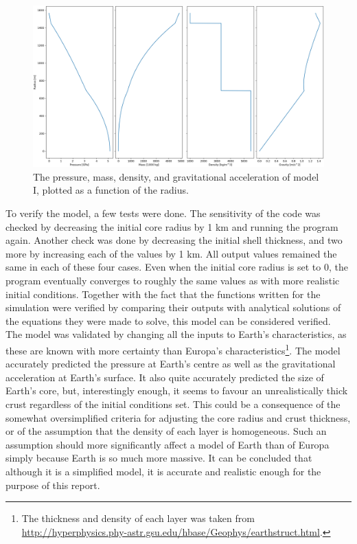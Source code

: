 \documentclass[twocolumn]{article}
\begin{document}
\begin{figure}[h]
	\centering
	\includegraphics[width=\textwidth]{profile1.png}
	\caption{The pressure, mass, density, and gravitational acceleration of model I, plotted as a function of the radius.}
	\label{fig:profile1}
\end{figure}
To verify the model, a few tests were done. The sensitivity of the code was checked by decreasing the initial core radius by 1 km and running the program again. Another check was done by decreasing the initial shell thickness, and two more by increasing each of the values by 1 km. All output values remained the same in each of these four cases. Even when the initial core radius is set to 0, the program eventually converges to roughly the same values as with more realistic initial conditions. Together with the fact that the functions written for the simulation were verified by comparing their outputs with analytical solutions of the equations they were made to solve, this model can be considered verified.\\
The model was validated by changing all the inputs to Earth's characteristics, as these are known with more certainty than Europa's characteristics\footnote{The thickness and density of each layer was taken from \url{http://hyperphysics.phy-astr.gsu.edu/hbase/Geophys/earthstruct.html}.}. The model accurately predicted the pressure at Earth's centre as well as the gravitational acceleration at Earth's surface. It also quite accurately predicted the size of Earth's core, but, interestingly enough, it seems to favour an unrealistically thick crust regardless of the initial conditions set. This could be a consequence of the somewhat oversimplified criteria for adjusting the core radius and crust thickness, or of the assumption that the density of each layer is homogeneous. Such an assumption should more significantly affect a model of Earth than of Europa simply because Earth is so much more massive. It can be concluded that although it is a simplified model, it is accurate and realistic enough for the purpose of this report.
\end{document}
